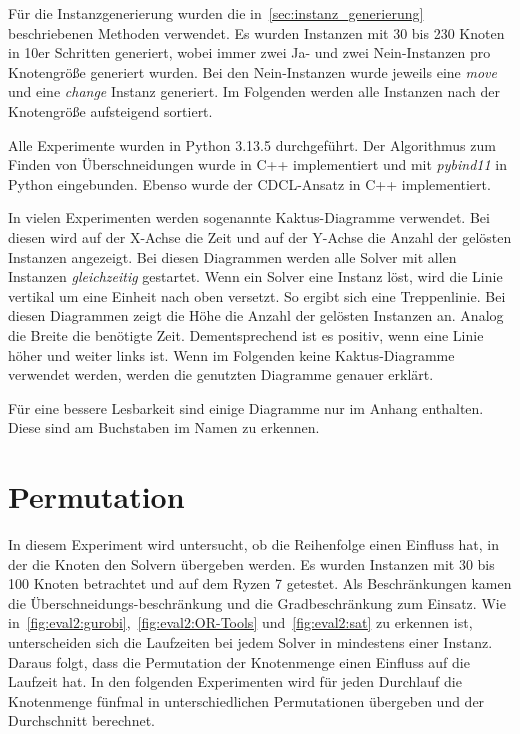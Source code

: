 Für die Instanzgenerierung wurden die in~\cref{sec:instanz_generierung} beschriebenen Methoden verwendet.
Es wurden Instanzen mit 30 bis 230 Knoten in 10er Schritten generiert, wobei immer zwei Ja- und zwei Nein-Instanzen pro Knotengröße generiert wurden.
Bei den Nein-Instanzen wurde jeweils eine \emph{move} und eine \emph{change} Instanz generiert.
Im Folgenden werden alle Instanzen nach der Knotengröße aufsteigend sortiert.   

Alle Experimente wurden in Python 3.13.5 durchgeführt.
Der Algorithmus zum Finden von Überschneidungen wurde in C++ implementiert und mit \emph{pybind11} in Python eingebunden.
Ebenso wurde der CDCL-Ansatz in C++ implementiert.

In vielen Experimenten werden sogenannte Kaktus-Diagramme verwendet.
Bei diesen wird auf der X-Achse die Zeit und auf der Y-Achse die Anzahl der gelösten Instanzen angezeigt.
Bei diesen Diagrammen werden alle Solver mit allen Instanzen \emph{gleichzeitig} gestartet.
Wenn ein Solver eine Instanz löst, wird die Linie vertikal um eine Einheit nach oben versetzt. 
So ergibt sich eine Treppenlinie.
Bei diesen Diagrammen zeigt die Höhe die Anzahl der gelösten Instanzen an.
Analog die Breite die benötigte Zeit.
Dementsprechend ist es positiv, wenn eine Linie höher und weiter links ist.
Wenn im Folgenden keine Kaktus-Diagramme verwendet werden, werden die genutzten Diagramme genauer erklärt.

Für eine bessere Lesbarkeit sind einige Diagramme nur im Anhang enthalten.
Diese sind am Buchstaben im Namen zu erkennen.




\section{Permutation}
\label{sec:eval2:permuation}
In diesem Experiment wird untersucht, ob die Reihenfolge einen Einfluss hat, in der die Knoten den Solvern übergeben werden.
Es wurden Instanzen mit 30 bis 100 Knoten betrachtet und auf dem Ryzen 7 getestet.
Als Beschränkungen kamen die Überschneidungs-beschränkung und die Gradbeschränkung zum Einsatz.
Wie in~\cref{fig:eval2:gurobi},~\cref{fig:eval2:OR-Tools} und~\cref{fig:eval2:sat} zu erkennen ist, unterscheiden sich die Laufzeiten bei jedem Solver in mindestens einer Instanz.
Daraus folgt, dass die Permutation der Knotenmenge einen Einfluss auf die Laufzeit hat.
In den folgenden Experimenten wird für jeden Durchlauf die Knotenmenge fünfmal in unterschiedlichen Permutationen übergeben und der Durchschnitt berechnet.

